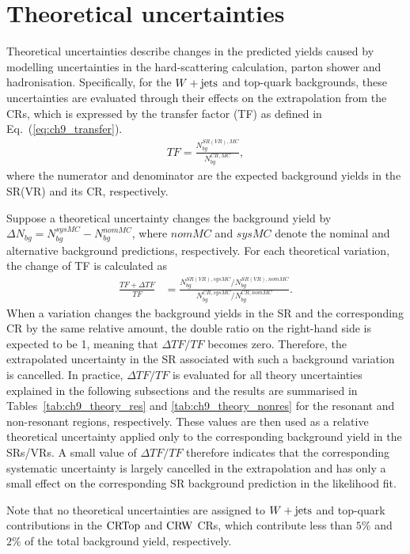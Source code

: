 \section{Theoretical uncertainties}
\label{sec:ch9_theory}

Theoretical uncertainties describe changes in the predicted yields caused by modelling uncertainties in the hard-scattering calculation, parton shower and hadronisation.
Specifically, for the $W+\mathrm{jets}$ and top-quark backgrounds, these uncertainties are evaluated through their effects on the extrapolation from the CRs, which is expressed by the transfer factor (TF) as defined in Eq.~(\ref{eq:ch9_transfer}).
\begin{align}
    TF=\frac{N_{bg}^{SR(VR),MC}}{N_{bg}^{CR,MC}},
    \label{eq:ch9_transfer}
\end{align}
where the numerator and denominator are the expected background yields in the SR(VR) and its CR, respectively.

Suppose a theoretical uncertainty changes the background yield by $\Delta N_{bg}=N_{bg}^{sysMC}-N_{bg}^{nomMC}$, where $nomMC$ and $sysMC$ denote the nominal and alternative background predictions, respectively.
For each theoretical variation, the change of TF is calculated as
\begin{align*}
    \frac{TF+\Delta TF}{TF}
    &=
    \frac{N_{bg}^{SR(VR),sysMC}/N_{bg}^{SR(VR),nomMC}}
         {N_{bg}^{CR,sysMC}/N_{bg}^{CR,nomMC}}.
\end{align*}
When a variation changes the background yields in the SR and the corresponding CR by the same relative amount, the double ratio on the right-hand side is expected to be 1, meaning that $\Delta TF/TF$ becomes zero.
Therefore, the extrapolated uncertainty in the SR associated with such a background variation is cancelled.
In practice, $\Delta TF/TF$ is evaluated for all theory uncertainties explained in the following subsections and the results are summarised in Tables~\ref{tab:ch9_theory_res} and \ref{tab:ch9_theory_nonres} for the resonant and non-resonant regions, respectively.
These values are then used as a relative theoretical uncertainty applied only to the corresponding background yield in the SRs/VRs.
A small value of $\Delta TF/TF$ therefore indicates that the corresponding systematic uncertainty is largely cancelled in the extrapolation and has only a small effect on the corresponding SR background prediction in the likelihood fit.

Note that no theoretical uncertainties are assigned to $W+\mathrm{jets}$ and top-quark contributions in the $\mathrm{CRTop}$ and $\mathrm{CRW}$ CRs, which contribute less than $5\%$ and $2\%$ of the total background yield, respectively.


